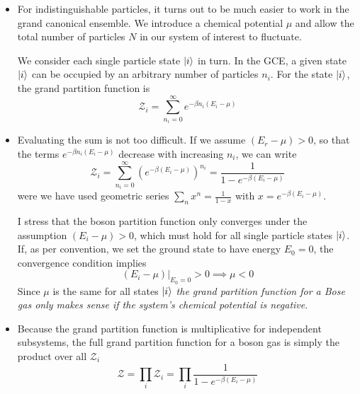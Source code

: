 \documentclass[11pt, a4paper]{article}
\begin{document}
\begin{itemize}
	\item For indistinguishable particles, it turns out to be much easier to work in the grand canonical ensemble. We introduce a chemical potential $ \mu $ and allow the total number of particles $ N $ in our system of interest to fluctuate.  
	
	We consider each single particle state $ \ket{i} $ in turn. In the GCE, a given state $ \ket{i} $ can be occupied by an arbitrary number of particles $ n_{i} $. For the state $ \ket{i} $, the grand partition function is
	\begin{equation*}
		\mathcal{Z}_{i} = \sum_{n_{i}=0}^{\infty} e^{-\beta n_{i}(E_{i} - \mu)}
	\end{equation*}
	
	\item Evaluating the sum is not too difficult. If we assume $ (E_{r} - \mu) > 0 $, so that the terms $ e^{-\beta n_{i}(E_{i} - \mu)} $ decrease with increasing $ n_{i} $, we can write
	\begin{equation*}
		\mathcal{Z}_{i} = \sum_{n_{i}=0}^{\infty} \left(e^{-\beta (E_{i} - \mu)}\right)^{n_{i}} = \frac{1}{1 - e^{-\beta (E_{i} - \mu)}}
	\end{equation*}
	were we have used geometric series $ \sum_{n} x^{n} = \frac{1}{1 - x} $ with $ x = e^{-\beta (E_{i} - \mu)} $. 
	
	I stress that the boson partition function only converges under the assumption $ (E_{i} - \mu) > 0 $, which must hold for all single particle states $ \ket{i} $. If, as per convention, we set the ground state to have energy $ E_{0} = 0 $, the convergence condition implies 
	\begin{equation*}
		(E_{i} - \mu)\big |_{E_{0} = 0} > 0 \implies \mu < 0 
	\end{equation*}
	Since $ \mu $ is the same for all states $ \ket{i} $ \textit{the grand partition function for a Bose gas only makes sense if the system's chemical potential is negative}.
	
	\item Because the grand partition function is multiplicative for independent subsystems, the full grand partition function for a boson gas is simply the product over all $ \mathcal{Z}_{i} $
	\begin{equation*}
		\mathcal{Z} = \prod_{i} \mathcal{Z}_{i} = \prod_{i} \frac{1}{1 - e^{-\beta (E_{i} - \mu)}}
	\end{equation*}
	

\end{itemize}
\end{document}
